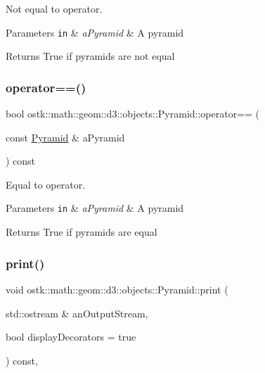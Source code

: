 Not equal to operator. 


\begin{DoxyParams}[1]{Parameters}
\mbox{\tt in}  & {\em a\+Pyramid} & A pyramid \\
\hline
\end{DoxyParams}
\begin{DoxyReturn}{Returns}
True if pyramids are not equal 
\end{DoxyReturn}
\mbox{\label{classostk_1_1math_1_1geom_1_1d3_1_1objects_1_1_pyramid_a9385744e89111818c847fb440ae66ba4}} 
\subsubsection{\texorpdfstring{operator==()}{operator==()}}
{\footnotesize\ttfamily bool ostk\+::math\+::geom\+::d3\+::objects\+::\+Pyramid\+::operator== (\begin{DoxyParamCaption}\item[{const \hyperlink{classostk_1_1math_1_1geom_1_1d3_1_1objects_1_1_pyramid}{Pyramid} \&}]{a\+Pyramid }\end{DoxyParamCaption}) const}



Equal to operator. 


\begin{DoxyParams}[1]{Parameters}
\mbox{\tt in}  & {\em a\+Pyramid} & A pyramid \\
\hline
\end{DoxyParams}
\begin{DoxyReturn}{Returns}
True if pyramids are equal 
\end{DoxyReturn}
\mbox{\label{classostk_1_1math_1_1geom_1_1d3_1_1objects_1_1_pyramid_ae308eee53a721c8c41463a1ec4842a2d}} 
\subsubsection{\texorpdfstring{print()}{print()}}
{\footnotesize\ttfamily void ostk\+::math\+::geom\+::d3\+::objects\+::\+Pyramid\+::print (\begin{DoxyParamCaption}\item[{std\+::ostream \&}]{an\+Output\+Stream,  }\item[{bool}]{display\+Decorators = {\ttfamily true} }\end{DoxyParamCaption}) const\hspace{0.3cm}{\ttfamily [override]}, {\ttfamily [virtual]}}



